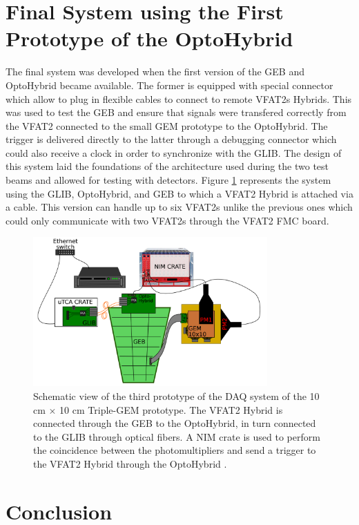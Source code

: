   \section{Final System using the First Prototype of the OptoHybrid}

    The final system was developed when the first version of the GEB and OptoHybrid became available. The former is equipped with special connector which allow to plug in flexible cables to connect to remote VFAT2s Hybrids. This was used to test the GEB and ensure that signals were transfered correctly from the VFAT2 connected to the small GEM prototype to the OptoHybrid. The trigger is delivered directly to the latter through a debugging connector which could also receive a clock in order to synchronize with the GLIB. The design of this system laid the foundations of the architecture used during the two test beams and allowed for testing with detectors. Figure \ref{fig:III-1-sys-3} represents the system using the GLIB, OptoHybrid, and GEB to which a VFAT2 Hybrid is attached via a cable. This version can handle up to six VFAT2s unlike the previous ones which could only communicate with two VFAT2s through the VFAT2 FMC board.

    \begin{figure}[h!]
      \centering
      \includegraphics[width=0.8\textwidth]{img/III-1-arch/sys_3.png}
      \caption{Schematic view of the third prototype of the DAQ system of the 10 cm $ \times $ 10 cm Triple-GEM prototype. The VFAT2 Hybrid is connected through the GEB to the OptoHybrid, in turn connected to the GLIB through optical fibers. A NIM crate is used to perform the coincidence between the photomultipliers and send a trigger to the VFAT2 Hybrid through the OptoHybrid \cite{Leonard:2065693}.}
      \label{fig:III-1-sys-3}
    \end{figure}

  \section{Conclusion}

